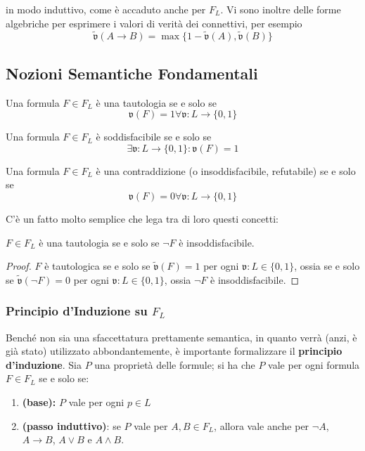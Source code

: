 \noindent
in modo induttivo, come è accaduto anche per $F_L$.
Vi sono inoltre delle forme algebriche per esprimere i valori di verità dei connettivi, 
per esempio 
$$
\widetilde{\mathfrak{v}}(A \rightarrow B) = \max\{1-\widetilde{\mathfrak{v}}(A), \widetilde{\mathfrak{v}}(B)\}
$$
\subsection{Nozioni Semantiche Fondamentali}

\begin{defi}[Tautologia]
Una formula $F \in F_L$ è una tautologia se e solo se 
$$
\mathfrak{v}(F) = 1 \forall \mathfrak{v} : L \rightarrow \{0,1\}
$$
\end{defi}
\begin{defi}
Una formula $F \in F_L$ è soddisfacibile se e solo se 
$$
\exists \mathfrak{v}:L \rightarrow \{0,1\} : \mathfrak{v}(F) = 1
$$
\end{defi}
\begin{defi}[Contraddizione]
Una formula $F \in F_L$ è una contraddizione (o insoddisfacibile, refutabile) se e solo 
se 
$$
\mathfrak{v}(F) = 0 \forall \mathfrak{v}: L \rightarrow \{0,1\}
$$
\end{defi}
C'è un fatto molto semplice che lega tra di loro questi concetti: 
\begin{teon}
$F \in F_L$ è una tautologia se e solo se $\neg F$ è insoddisfacibile. 
\end{teon}
\begin{proof}
  $F$ è tautologica se e solo se $\widetilde{\mathfrak{v}}(F) = 1$ per 
  ogni $\mathfrak{v}: L \in \{0,1\}$, ossia se e solo se $\widetilde{\mathfrak{v}}(\neg F) 
  = 0$ per ogni $\mathfrak{v}: L \in \{0,1\}$, ossia $\neg F$ è insoddisfacibile. 
\end{proof}

\subsubsection{Principio d'Induzione su $F_L$}
Benché non sia una sfaccettatura prettamente semantica, in quanto verrà 
(anzi, è già stato) utilizzato abbondantemente, è importante formalizzare 
il  \textbf{principio d'induzione}. Sia 
$P$ una proprietà delle formule; si ha che 
$P$ vale per ogni formula $F \in F_L$ se e solo se: 
\begin{enumerate}
  \item \textbf{(base):} $P$ vale per ogni $p \in L$
  \item \textbf{(passo induttivo)}: se $P$ vale per $A,B  \in F_L$, allora 
    vale anche per $\neg A$, $A \rightarrow B$, $A \lor B$ e $A \land B$. 
\end{enumerate}

